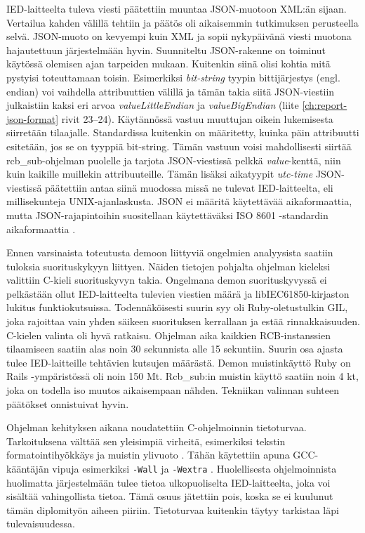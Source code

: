 IED-laitteelta tuleva viesti päätettiin muuntaa JSON-muotoon XML:än sijaan. Vertailua kahden välillä tehtiin ja päätös oli aikaisemmin tutkimuksen perusteella selvä. JSON-muoto on kevyempi kuin XML ja sopii nykypäivänä viesti muotona hajautettuun järjestelmään hyvin. Suunniteltu JSON-rakenne on toiminut käytössä olemisen ajan tarpeiden mukaan. Kuitenkin siinä olisi kohtia mitä pystyisi toteuttamaan toisin. Esimerkiksi \emph{bit-string} tyypin bittijärjestys (engl. endian) voi vaihdella attribuuttien välillä ja tämän takia siitä JSON-viestiin julkaistiin kaksi eri arvoa \emph{valueLittleEndian} ja \emph{valueBigEndian} (liite \ref{ch:report-json-format} rivit 23--24). Käytännössä vastuu muuttujan oikein lukemisesta siirretään tilaajalle. Standardissa kuitenkin on määritetty, kuinka päin attribuutti esitetään, jos se on tyyppiä bit-string. Tämän vastuun voisi mahdollisesti siirtää rcb\_sub-ohjelman puolelle ja tarjota JSON-viestissä pelkkä \emph{value}-kenttä, niin kuin kaikille muillekin attribuuteille. Tämän lisäksi aikatyypit \emph{utc-time} JSON-viestissä päätettiin antaa siinä muodossa missä ne tulevat IED-laitteelta, eli millisekunteja UNIX-ajanlaskusta. JSON ei määritä käytettävää aikaformaattia, mutta JSON-rajapintoihin suositellaan käytettäväksi ISO 8601 -standardin aikaformaattia \cite{json-api-specification}.

Ennen varsinaista toteutusta demoon liittyviä ongelmien analyysista saatiin tuloksia suorituskykyyn liittyen. Näiden tietojen pohjalta ohjelman kieleksi valittiin C-kieli suorituskyvyn takia. Ongelmana demon suorituskyvyssä ei pelkästään ollut IED-laitteelta tulevien viestien määrä ja libIEC61850-kirjaston lukitus funktiokutsuissa. Todennäköisesti suurin syy oli Ruby-oletustulkin GIL, joka rajoittaa vain yhden säikeen suorituksen kerrallaan ja estää rinnakkaisuuden. C-kielen valinta oli hyvä ratkaisu. Ohjelman aika kaikkien RCB-instanssien tilaamiseen saatiin alas noin 30 sekunnista alle 15 sekuntiin. Suurin osa ajasta tulee IED-laitteille tehtävien kutsujen määrästä. Demon muistinkäyttö Ruby on Rails -ympäristössä oli noin 150 Mt. Rcb\_sub:in muistin käyttö saatiin noin 4 kt, joka on todella iso muutos aikaisempaan nähden. Tekniikan valinnan suhteen päätökset onnistuivat hyvin.

Ohjelman kehityksen aikana noudatettiin C-ohjelmoinnin tietoturvaa. Tarkoituksena välttää sen yleisimpiä virheitä, esimerkiksi tekstin formatointihyökkäys \cite{format-string-attack} ja muistin ylivuoto \cite{buffer-overflow-attack}. Tähän käytettiin apuna GCC-kääntäjän vipuja esimerkiksi \texttt{-Wall} ja \texttt{-Wextra} \cite{gcc-manual-warnings}. Huolellisesta ohjelmoinnista huolimatta järjestelmään tulee tietoa ulkopuoliselta IED-laitteelta, joka voi sisältää vahingollista tietoa. Tämä osuus jätettiin pois, koska se ei kuulunut tämän diplomityön aiheen piiriin. Tietoturvaa kuitenkin täytyy tarkistaa läpi tulevaisuudessa.

